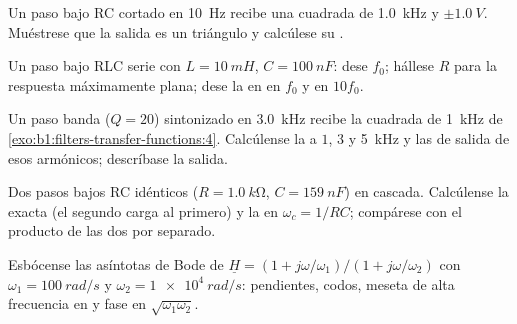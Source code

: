 \begin{exercise}[$\star\star$]\label{exo:b1:filters-transfer-functions:6}
Un paso bajo RC cortado en \qty{10}{Hz} recibe una  cuadrada de
\qty{1.0}{kHz} y  $\pm\qty{1.0}{V}$. Muéstrese que la salida es un
triángulo y calcúlese su .
\end{exercise}

\begin{exercise}[$\star\star$]\label{exo:b1:filters-transfer-functions:7}
Un paso bajo RLC serie con $L = \qty{10}{mH}$, $C = \qty{100}{nF}$: dese
$f_0$; hállese $R$ para la respuesta máximamente plana; dese la 
en  en $f_0$ y en $10f_0$.
\end{exercise}

\begin{exercise}[$\star\star$]\label{exo:b1:filters-transfer-functions:8}
Un paso banda ($Q = 20$) sintonizado en \qty{3.0}{kHz} recibe la 
cuadrada de \qty{1}{kHz} de \cref{exo:b1:filters-transfer-functions:4}.
Calcúlense la  a $1$, $3$ y \qty{5}{kHz} y las  de
salida de esos armónicos; descríbase la salida.
\end{exercise}

\begin{exercise}[$\star\star$]\label{exo:b1:filters-transfer-functions:9}
Dos pasos bajos RC idénticos ($R = \qty{1.0}{k\ohm}$, $C = \qty{159}{nF}$)
en cascada. Calcúlense la  exacta (el segundo
carga al primero) y la  en $\omega_c = 1/RC$; compárese con el
producto de las dos  por separado.
\end{exercise}

\begin{exercise}[$\star\star\star$]\label{exo:b1:filters-transfer-functions:10}
Esbócense las asíntotas de Bode de $\underline H = (1 + j\omega/\omega_1)/
(1 + j\omega/\omega_2)$ con $\omega_1 = \qty{100}{rad/s}$ y $\omega_2 =
\qty{1e4}{rad/s}$: pendientes, codos, meseta de alta frecuencia en
 y fase en $\sqrt{\omega_1\omega_2}$.
\end{exercise}

